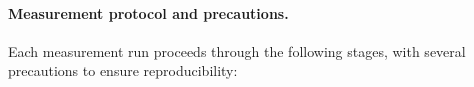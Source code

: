 


\paragraph{Measurement protocol and precautions.}
Each measurement run proceeds through the following stages, with several precautions to ensure reproducibility:

